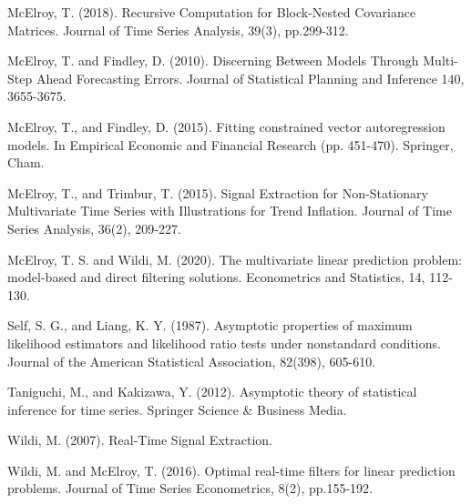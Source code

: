 \documentclass[a4paper]{book}
\begin{document}
\begin{thebibliography}{99}
\bibitem{} McElroy, T. (2018). Recursive Computation for Block-Nested Covariance Matrices. Journal of Time Series Analysis, 39(3), pp.299-312.

\bibitem{} McElroy, T. and Findley, D. (2010). 
   Discerning Between Models Through Multi-Step Ahead
Forecasting Errors. Journal of Statistical Planning and Inference 140, 3655-3675.

\bibitem{} McElroy, T., and Findley, D. (2015). Fitting constrained vector autoregression models. In Empirical Economic and Financial Research (pp. 451-470). Springer, Cham.

\bibitem{} McElroy, T., and Trimbur, T. (2015). Signal Extraction for Non-Stationary Multivariate Time Series with Illustrations for Trend Inflation. Journal of Time 
Series Analysis, 36(2), 209-227.


\bibitem{} McElroy, T. S. and Wildi, M. (2020). The multivariate linear prediction problem: model-based and direct filtering solutions. Econometrics and Statistics, 14, 112-130.

\bibitem{} Self, S. G., and Liang, K. Y. (1987). Asymptotic properties of maximum likelihood estimators and likelihood ratio tests under nonstandard conditions. Journal of the American Statistical Association, 82(398), 605-610.

\bibitem{} Taniguchi, M., and Kakizawa, Y. (2012). Asymptotic theory of statistical inference for time series. Springer Science \& Business Media.

\bibitem{} Wildi, M. (2007). Real-Time Signal Extraction.

\bibitem{} Wildi, M. and McElroy, T. (2016). Optimal real-time filters for linear prediction problems. Journal of Time Series Econometrics, 8(2), pp.155-192.

\end{thebibliography}
\end{document}
